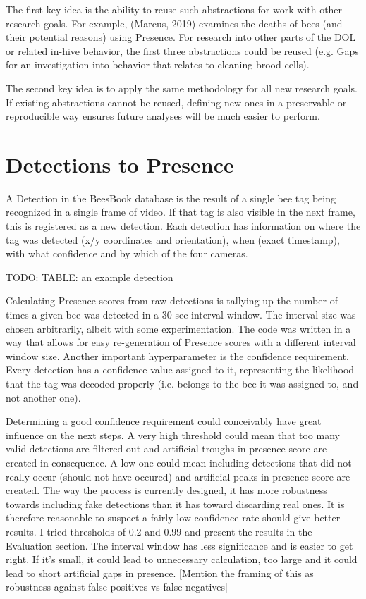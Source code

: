 The first key idea is the ability to reuse such abstractions for work with
other research goals. For example, (Marcus, 2019) examines the deaths of bees %
(and their potential reasons) using Presence. 
For research into other parts of the DOL or related in-hive
behavior, the first three abstractions could be reused (e.g. Gaps
for an investigation into behavior that relates to cleaning brood cells). 

The second key idea is to apply the same methodology for all new research goals.
If existing abstractions cannot be reused, defining new ones in a preservable or 
reproducible way ensures future analyses will be much easier to perform.  



\section{Detections to Presence}
A Detection in the BeesBook database is the result of a single bee tag being
recognized in a single frame of video. If that tag is also visible in the next
frame, this is registered as a new detection. Each detection has information on
where the tag was detected (x/y coordinates and orientation), when (exact
timestamp), with what confidence and by which of the four cameras. 

TODO: TABLE: an example detection

Calculating Presence scores from raw detections is tallying up the number of
times a given bee was detected in a 30-sec interval window. The interval size
was chosen arbitrarily, albeit with some experimentation. The code was written
in a way that allows for easy re-generation of Presence scores with a different
interval window size. Another important hyperparameter is the confidence
requirement. Every detection has a confidence value assigned to it, representing
the likelihood that the tag was decoded properly (i.e. belongs to the bee it was
assigned to, and not another one).

Determining a good confidence requirement could conceivably have great influence
on the next steps. A very high threshold could mean that too many valid
detections are filtered out and artificial troughs in presence score are created
in consequence. A low one could mean including detections that did not really
occur (should not have occured) and artificial peaks in presence score are
created. The way the process is currently designed, it has more robustness
towards including fake detections than it has toward discarding real ones. It is
therefore reasonable to suspect a fairly low confidence rate should give better results. 
I tried thresholds of $0.2$ and $0.99$ and present the results in the Evaluation section.
The interval window has less significance and is easier to get right. If it’s small, it could
lead to unnecessary calculation, too large and it could lead to short artificial
gaps in presence. [Mention the framing of this as robustness against false
positives vs false negatives]

